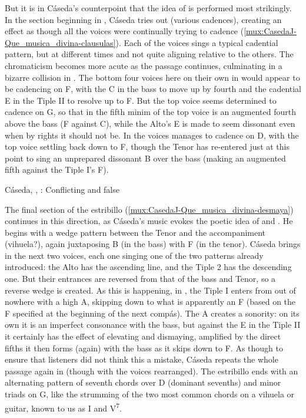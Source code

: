 But it is in Cáseda's counterpoint that the idea of  is
performed most strikingly. 
In the section beginning in , Cáseda tries out  (various cadences), creating an effect as though all the voices were
continually trying to cadence (\cref{mux:CasedaJ-Que_musica_divina-clausulas}).
Each of the voices sings a typical cadential pattern, but at different times
and not quite aligning relative to the others.
The chromaticism becomes more acute as the passage continues, culminating in a
bizarre collision in .
The bottom four voices here on their own in  would appear to be
cadencing on F, with the C in the bass to move up by fourth and the cadential E
in the Tiple II to resolve up to F.
But the top voice seems determined to cadence on G, so that in the fifth minim
of  the top voice is an augmented fourth above the bass (F\sh{}
against C), while the Alto's E is made to seem dissonant even when by rights it
should not be.
In  the voices manages to cadence on D, with the top voice settling
back down to F\sh, though the Tenor has re-entered just at this point to sing
an unprepared dissonant B\fl{} over the bass (making an augmented fifth against
the Tiple I's F\sh).

{Cáseda, , : Conflicting
 and false }


The final section of the estribillo
(\cref{mux:CasedaJ-Que_musica_divina-desmaya}) continues in this direction,
as Cáseda's music evokes the poetic idea of  and
.
He begins with a wedge pattern between the Tenor and the accompaniment
(vihuela?), again juxtaposing B\fl{} (in the bass) with F\sh{} (in the tenor).
Cáseda brings in the next two voices, each one singing one of the two patterns
already introduced: the Alto has the ascending line, and the Tiple 2 has the
descending one.
But their entrances are reversed from that of the bass and Tenor, so a reverse
wedge is created.
As this is happening, in , the Tiple I enters from out of nowhere
with a high A, skipping down to what is apparently an F\na{} (based on the
F\sh{} specified at the beginning of the next compás).
The A creates a  sonority: on its own it is an imperfect
consonance with the bass, but against the E\fl{} in the Tiple II it certainly
has the effect of elevating and dismaying, amplified by the direct fifths it
then forms (again) with the bass as it skips down to F.
As though to ensure that listeners did not think this a mistake, Cáseda repeats
the whole passage again in  (though with the voices rearranged).
The estribillo ends with an alternating pattern of seventh chords over D
(dominant sevenths) and minor triads on G, like the strumming of the two most
common chords on a vihuela or guitar, known to us as I and
V\textsuperscript{7}.

